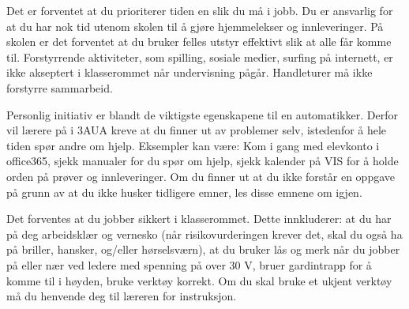 \vskip 10pt

%
%
%
%
%

\noindent
{} Det er forventet at du prioriterer tiden en slik du må i jobb. Du er ansvarlig for at du har nok tid utenom skolen til å gjøre hjemmelekser og innleveringer. På skolen er det forventet at du bruker felles utstyr effektivt slik at alle får komme til. Forstyrrende aktiviteter, som spilling, sosiale medier, surfing på internett, er ikke akseptert i klasserommet når undervisning pågår. Handleturer må ikke forstyrre sammarbeid. 


\vskip 10pt



\noindent
{} Personlig initiativ er blandt de viktigste egenskapene til en automatikker. Derfor vil lærere på i 3AUA kreve at du finner ut av problemer selv, istedenfor å hele tiden spør andre om hjelp. Eksempler kan være: Kom i gang med elevkonto i office365, sjekk manualer for du spør om hjelp, sjekk kalender på VIS for å holde orden på prøver og innleveringer. Om du finner ut at du ikke forstår en oppgave på grunn av at du ikke husker tidligere emner, les disse emnene om igjen. 
\vskip 10pt

\noindent
{} Det forventes at du jobber sikkert i klasserommet. Dette innkluderer: at du har på deg arbeidsklær og vernesko (når risikovurderingen krever det,  skal du også ha på briller, hansker, og/eller hørselsværn), at du bruker lås og merk når du jobber på eller nær ved ledere med spenning på over 30 V, bruer gardintrapp for å komme til i høyden, bruke verktøy korrekt. Om du skal bruke et ukjent verktøy må du henvende deg til læreren for instruksjon. 
\vskip 10pt

